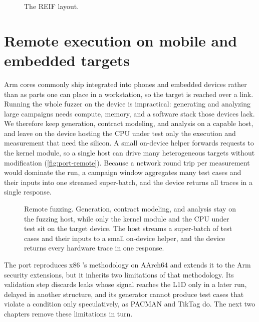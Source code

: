 \begin{figure}[t]
\centering
\fitwidth{}
\caption{The REIF layout.}
\label{fig:port-reif}
\end{figure}

\section{Remote execution on mobile and embedded targets}
\label{sec:port-remote}

Arm cores commonly ship integrated into phones and embedded devices rather than as parts one
can place in a workstation, so the target is reached over a link. Running the whole fuzzer on
the device is impractical: generating and analyzing large campaigns needs compute, memory, and
a software stack those devices lack. We therefore keep generation, contract modeling, and
analysis on a capable host, and leave on the device hosting the CPU under test only the
execution and measurement that need the silicon. A small on-device helper forwards requests to
the kernel module, so a single host can drive many heterogeneous targets without modification (\autoref{fig:port-remote}).
Because a network round trip per measurement would dominate the run, a campaign window
aggregates many test cases and their inputs into one streamed super-batch, and the device
returns all traces in a single response.

\begin{figure}[ht]
\centering
\fitwidth{}
\caption{Remote fuzzing. Generation, contract modeling, and analysis stay on the fuzzing host,
while only the kernel module and the CPU under test sit on the target device. The host streams a
super-batch of test cases and their inputs to a small on-device helper, and the device returns
every hardware trace in one response.}
\label{fig:port-remote}
\end{figure}

\medskip
The port reproduces x86 \revizor{}'s methodology on AArch64 and extends it to the Arm security
extensions, but it inherits two limitations of that methodology. Its validation step discards
leaks whose signal reaches the L1D only in a later run, delayed in another structure, and its
generator cannot produce test cases that violate a condition only speculatively, as PACMAN and
TikTag do. The next
two chapters remove these limitations in turn.
